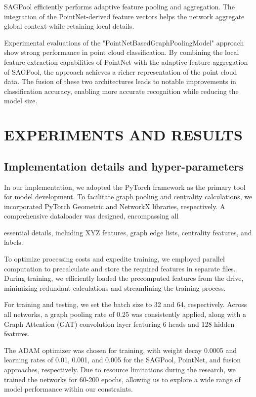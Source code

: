 \documentclass[conference]{IEEEtran}
\begin{document}
SAGPool efficiently performs adaptive feature pooling and aggregation. The integration of the PointNet-derived feature vectors helps the network aggregate global context while retaining local details.

Experimental evaluations of the "PointNetBasedGraphPoolingModel" approach show strong performance in point cloud classification. By combining the local feature extraction capabilities of PointNet with the adaptive feature aggregation of SAGPool, the approach achieves a richer representation of the point cloud data. The fusion of these two architectures leads to notable improvements in classification accuracy, enabling more accurate recognition while reducing the model size.


\section{EXPERIMENTS AND RESULTS}

\subsection{Implementation details and hyper-parameters}
In our implementation, we adopted the PyTorch framework as the primary tool for model development. To facilitate graph pooling and centrality calculations, we incorporated PyTorch Geometric and NetworkX libraries, respectively. A comprehensive dataloader was designed, encompassing all

essential details, including XYZ features, graph edge lists, centrality features, and labels.

To optimize processing costs and expedite training, we employed parallel computation to precalculate and store the required features in separate files. During training, we efficiently loaded the precomputed features from the drive, minimizing redundant calculations and streamlining the training process.

For training and testing, we set the batch size to 32 and 64, respectively. Across all networks, a graph pooling rate of 0.25 was consistently applied, along with a Graph Attention (GAT) convolution layer featuring 6 heads and 128 hidden features.

The ADAM optimizer was chosen for training, with weight decay 0.0005 and learning rates of 0.01, 0.001, and 0.005 for the SAGPool, PointNet, and fusion approaches, respectively. Due to resource limitations during the research, we trained the networks for 60-200 epochs, allowing us to explore a wide range of model performance within our constraints.
\end{document}
